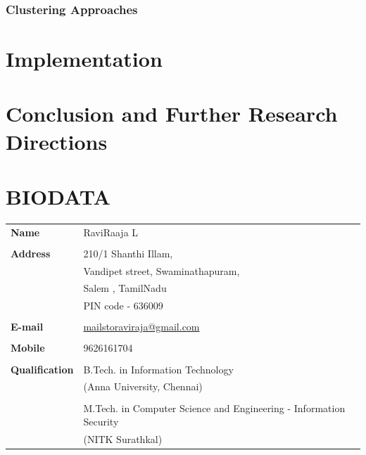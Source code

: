 \documentclass[a4paper,12pt, twoside]{NITKReport}
\begin{document}
\subsection{Clustering Approaches}
\subsubsection{}













\newpage
\chapter{Implementation}


\newpage
\chapter{Conclusion and Further Research Directions}
\label{conclusion}

	





\newpage
\pagestyle{plain}
\thispagestyle{empty}
\chapter*{\centering BIODATA}

\begin{table}[htbp]
	\centering
	\begin{adjustbox}{center}	
		\begin{tabular}{p{4cm} p{7cm}}
			\textbf{Name} & RaviRaaja L\\
			&\\
			\textbf{Address} & 210/1 Shanthi Illam,\\
			& Vandipet street, Swaminathapuram,\\
			& Salem , TamilNadu\\
			& PIN code - 636009\\
			&\\
			
			\textbf{E-mail} & \href{mailto:mailstoraviraaja@gmail.com}{mailstoraviraja@gmail.com}\\
			&\\
			
			\textbf{Mobile} & 9626161704\\
			&\\
			
			\textbf{Qualification} & B.Tech. in Information Technology\\
			& (Anna University, Chennai)\\
			&\\ 
            & M.Tech. in Computer Science and Engineering - Information Security\\
			& (NITK Surathkal)\\
		\end{tabular}
	\end{adjustbox}
\end{table}
\end{document}
